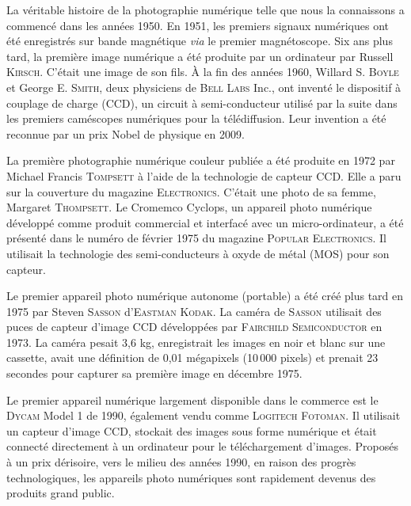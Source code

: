 La véritable histoire de la photographie numérique telle que nous la connaissons a commencé dans les années 1950. En 1951, les premiers signaux numériques ont été enregistrés sur bande magnétique \textit{via} le premier magnétoscope. Six ans plus tard, la première image numérique a été produite par un ordinateur par Russell \textsc{Kirsch}. C'était une image de son fils. À la fin des années 1960, Willard S. \textsc{Boyle} et George E. \textsc{Smith}, deux physiciens de \textsc{Bell Labs} Inc., ont inventé le dispositif à couplage de charge (CCD), un circuit à semi-conducteur utilisé par la suite dans les premiers caméscopes numériques pour la télédiffusion. Leur invention a été reconnue par un prix Nobel de physique en 2009. 

La première photographie numérique couleur publiée a été produite en 1972 par Michael Francis \textsc{Tompsett} à l'aide de la technologie de capteur CCD. Elle a paru sur la couverture du magazine \textsc{Electronics}. C'était une photo de sa femme, Margaret \textsc{Thompsett}. Le Cromemco Cyclops, un appareil photo numérique développé comme produit commercial et interfacé avec un micro-ordinateur, a été présenté dans le numéro de février 1975 du magazine \textsc{Popular Electronics}. Il utilisait la technologie des semi-conducteurs à oxyde de métal (MOS) pour son capteur. %

Le premier appareil photo numérique autonome (portable) a été créé plus tard en 1975 par Steven \textsc{Sasson} d'\textsc{Eastman Kodak}. La caméra de \textsc{Sasson} utilisait des puces de capteur d'image CCD développées par \textsc{Fairchild Semiconductor} en 1973.  La caméra pesait 3,6 kg, enregistrait les images en noir et blanc sur une cassette, avait une définition de 0,01 mégapixels (10\,000 pixels) et prenait 23 secondes pour capturer sa première image en décembre 1975.

Le premier appareil numérique largement disponible dans le commerce est le \textsc{Dycam} Model 1 de 1990, également vendu comme \textsc{Logitech Fotoman}. Il utilisait un capteur d'image CCD, stockait des images sous forme numérique et était connecté directement à un ordinateur pour le téléchargement d'images. Proposés à un prix dérisoire, vers le milieu des années 1990, en raison des progrès technologiques, les appareils photo numériques sont rapidement devenus des produits grand public.

